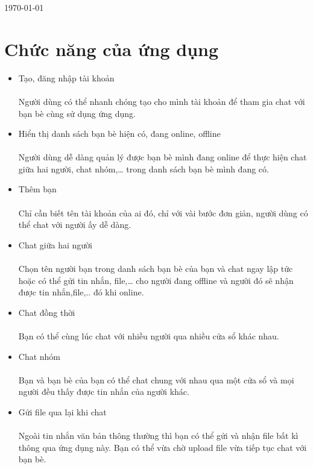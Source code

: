 \documentclass[10pt]{article}
\begin{document}
\begin{titlepage}
		\vspace{1cm}
		
		\begin{center}
			\Large \today
		\end{center}
	\end{titlepage}
	
	\newpage


	\newpage
	
	\tableofcontents
	
	\newpage
	
	\section{Chức năng của ứng dụng}
		\begin{itemize}
			\item Tạo, đăng nhập tài khoản \\\\
			Người dùng có thể nhanh chóng tạo cho mình tài khoản để tham gia chat với bạn bè cùng sử dụng ứng dụng.
			\item Hiển thị danh sách bạn bè hiện có, đang online, offline\\\\
			Người dùng dễ dàng quản lý được bạn bè mình đang online để thực hiện chat giữa hai người, chat nhóm,… trong danh sách bạn bè mình đang có.
			\item Thêm bạn\\\\
			Chỉ cần biết tên tài khoản của ai đó, chỉ với vài bước đơn giản, người dùng có thể chat với người ấy dễ dàng.
			\item Chat giữa hai người\\\\
			Chọn tên người bạn trong danh sách bạn bè của bạn và chat ngay lập tức hoặc có thể gửi tin nhắn, file,… cho người đang offline và người đó sẽ nhận được tin nhắn,file,.. đó khi online.
			\item Chat đồng thời\\\\
			Bạn có thể cùng lúc chat với nhiều người qua nhiều cửa sổ khác nhau.
			\item Chat nhóm\\\\
			Bạn và bạn bè của bạn có thể chat chung với nhau qua một cửa sổ và mọi người đều thấy được tin nhắn của người khác.
			\item Gửi file qua lại khi chat\\\\
			Ngoài tin nhắn văn bản thông thường thì bạn có thể gửi và nhận file bất kì thông qua ứng dụng này. Bạn có thể vừa chờ upload file vừa tiếp tục chat với bạn bè.

		\end{itemize}
		
\end{document}
